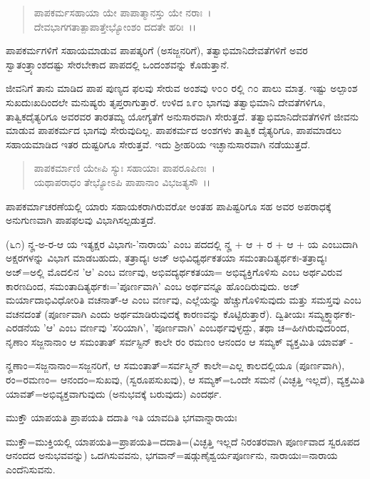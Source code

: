 \begin{verse}
ಪಾಪಕರ್ಮಸಹಾಯಾ ಯೇ ಪಾಪಾತ್ಮಾನಸ್ತು ಯೇ ನರಾಃ~।\\ ದೇವಭಾಗಗತಾತ್ಪಾಪಾತ್ತೇಭ್ಯೋಂಶಂ ದದತೇ ಹರಿಃ~।।
\end{verse}


ಪಾಪಕರ್ಮಗಳಿಗೆ ಸಹಾಯಮಾಡುವ ಪಾಪತ್ಕರಿಗೆ (ಅಸಜ್ಜನರಿಗೆ), ತತ್ವಾಭಿಮಾನಿದೇವತೆಗಳಿಗೆ ಅವರ ಸ್ವಾತಂತ್ರ್ಯಾಂಶದಷ್ಟು ಸೇರಬೇಕಾದ ಪಾಪದಲ್ಲಿ ಒಂದಂಶವನ್ನು ಕೊಡುತ್ತಾನೆ.

ಜೀವನಿಗೆ ತಾನು ಮಾಡಿದ ಪಾಪ ಪುಣ್ಯದ ಫಲವು ಸೇರುವ ಅಂಶವು ೪೦೦ ರಲ್ಲಿ ೧೦ ಪಾಲು ಮಾತ್ರ. ಇಷ್ಟು ಅಲ್ಪಾಂಶ ಸುಖದುಃಖದಿಂದಲೇ ಮನುಷ್ಯರು ತೃಪ್ತರಾಗುತ್ತಾರೆ. ಉಳಿದ ೩೯೦ ಭಾಗವು ತತ್ವಾಭಿಮಾನಿ ದೇವತೆಗಳಿಗೂ, ತಾತ್ವಿಕದೈತ್ಯರಿಗೂ ಅವರವರ ತಾರತಮ್ಯ ಯೋಗ್ಯತೆಗೆ ಅನುಸಾರವಾಗಿ ಸೇರುತ್ತದೆ. ತತ್ವಾಭಿಮಾನಿದೇವತೆಗಳಿಗೆ ಜೀವನು ಮಾಡುವ ಪಾಪಕರ್ಮದ ಭಾಗವು ಸೇರುವುದಿಲ್ಲ. ಪಾಪಕರ್ಮದ ಅಂಶಗಳು ತಾತ್ವಿಕ ದೈತ್ಯರಿಗೂ, ಪಾಪಮಾಡಲು ಸಹಾಯಮಾಡಿದ ಇತರ ದುಷ್ಟರಿಗೂ ಸೇರುತ್ತವೆ. ಇದು ಶ‍್ರೀಹರಿಯ ಇಚ್ಛಾನುಸಾರವಾಗಿ ನಡೆಯುತ್ತದೆ.

\begin{verse}
ಪಾಪಕರ್ಮಾಣಿ ಯೇsಪಿ ಸ್ಯುಃ ಸಹಾಯಾಃ ಪಾಪರೂಪಿಣಃ~।\\ ಯಥಾಪರಾಧಂ ತೇಭ್ಯೋಽಪಿ ಪಾಪಾನಾಂ ವಿಭಜತ್ಯಸೌ~।।
\end{verse}


ಪಾಪಕರ್ಮಾಚರಣೆಯಲ್ಲಿ ಯಾರು ಸಹಾಯಕರಾಗಿರುವರೋ ಅಂತಹ ಪಾಪಿಷ್ಟರಿಗೂ ಸಹ ಅವರ ಅಪರಾಧಕ್ಕೆ ಅನುಗುಣವಾಗಿ ಪಾಪಫಲವು ವಿಭಾಗಿಸಲ್ಪಡುತ್ತದೆ.

(೬೧) ನೄ-ಅ-ರ-ಆ ಯ ಇತ್ಯಕ್ಷರ ವಿಭಾಗಃ-'ನಾರಾಯ' ಎಂಬ ಪದದಲ್ಲಿ ನೄ + ಆ + ರ + ಆ + ಯ ಎಂಬುದಾಗಿ ಅಕ್ಷರಗಳನ್ನು ವಿಭಾಗ ಮಾಡಬಹುದು, ತತ್ರಾದ್ಯಃ ಅಜ್ ಅಭಿವಿಧ್ಯರ್ಥಕತಯಾ ಸಮಂತಾದಿತ್ಯರ್ಥಕಃ-ತತ್ರಾದ್ಯಃ ಅಜ್=ಅಲ್ಲಿ ಮೊದಲಿನ 'ಆ' ಎಂಬ ವರ್ಣವು, ಅಭಿವದ್ಯರ್ಥಕತಯಾ= ಅಭಿವ್ಯಕ್ತಿಗೊಳಿಸು ಎಂಬ ಅರ್ಥವಿರುವ ಕಾರಣದಿಂದ, ಸಮಂತಾದಿತ್ಯರ್ಥಕಃ='ಪೂರ್ಣವಾಗಿ' ಎಂಬ ಅರ್ಥವನ್ನೂ ಹೊಂದಿರುವುದು. ಅಜ್ ಮರ್ಯಾದಾಭಿವಿಧೋರಿತಿ ವಚನಾತ್-ಆ ಎಂಬ ವರ್ಣವು, ಎಲ್ಲೆಯನ್ನು ಹೆಚ್ಚುಗೊಳಿಸುವುದು ಮತ್ತು ಸಮಸ್ತವು ಎಂಬ ವಚನದಂತೆ (ಪೂರ್ಣವಾಗಿ ಎಂದು ಅರ್ಥಮಾಡಿರುವುದಕ್ಕೆ ಕಾರಣವನ್ನು ಕೊಟ್ಟಿರುತ್ತಾರೆ). ದ್ವಿತೀಯಃ ಸಮ್ಯಕ್ತ್ವಾರ್ಥಕಃ-ಎರಡನೆಯ 'ಆ' ಎಂಬ ವರ್ಣವು 'ಸರಿಯಾಗಿ', 'ಪೂರ್ಣವಾಗಿ' ಎಂಬರ್ಥವುಳ್ಳದ್ದು, ತಥಾ ಚ=ಹೀಗಿರುವುದರಿಂದ, ನೃಣಾಂ ಸಜ್ಜನಾನಾಂ ಆ ಸಮಂತಾತ್ ಸರ್ವಸ್ಟಿನ್ ಕಾಲೇ ರಂ ರಮಣಂ ಆನಂದಂ ಆ ಸಮ್ಯಕ್ ವ್ಯಕ್ತಮಿತಿ ಯಾವತ್ - 

ನೄಣಾಂ=ಸಜ್ಜನಾನಾಂ=ಸಜ್ಜನರಿಗೆ, ಆ ಸಮಂತಾತ್=ಸರ್ವಸ್ಮಿನ್ ಕಾಲೇ=ಎಲ್ಲ ಕಾಲದಲ್ಲಿಯೂ (ಪೂರ್ಣವಾಗಿ), ರಂ=ರಮಣಂ= ಆನಂದಂ=ಸುಖವು, (ಸ್ವರೂಪಸುಖವು), ಆ ಸಮ್ಯಕ್=ಒಂದೇ ಸಮನೆ (ವಿಚ್ಛತ್ತಿ ಇಲ್ಲದೆ), ವ್ಯಕ್ತಮಿತಿ ಯಾವತ್=ಅಭಿವ್ಯಕ್ತವಾಗುವುದು (ಅನುಭವಕ್ಕೆ ಬರುವುದು) ಎಂದರ್ಥ.

ಮುಕ್ತೌ ಯಾಪಯತಿ ಪ್ರಾಪಯತಿ ದದಾತಿ ಇತಿ ಯಾವದಿತಿ ಭಗವಾನ್ನಾರಾಯಃ

ಮುಕ್ತೌ=ಮುಕ್ತಿಯಲ್ಲಿ ಯಾಪಯತಿ=ಪ್ರಾಪಯತಿ=ದದಾತಿ=(ವಿಚ್ಛತ್ತಿ ಇಲ್ಲದೆ ನಿರಂತರವಾಗಿ ಪೂರ್ಣವಾದ ಸ್ವರೂಪದ ಆನಂದದ ಅನುಭವವನ್ನು) ಒದಗಿಸುವವನು, ಭಗವಾನ್=ಷಡ್ಗುಣೈಶ್ವರ್ಯಪೂರ್ಣನು, ನಾರಾಯಃ=ನಾರಾಯ ಎಂದೆನಿಸುವನು.

